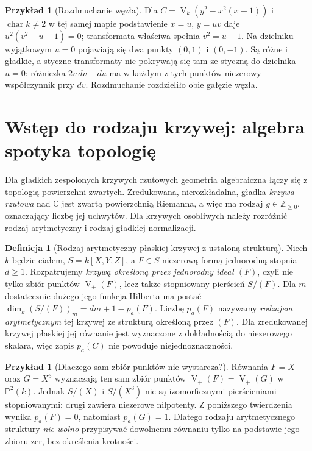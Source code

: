 \documentclass[11pt,a4paper,openany]{report}
\numberwithin{equation}{section}
\theoremstyle{plain}
\theoremstyle{definition}
\newtheorem{definicja}[twierdzenie]{Definicja}
\newtheorem{przyklad}[twierdzenie]{Przykład}
\theoremstyle{remark}
\newcommand{\Z}{\mathbb Z}
\newcommand{\C}{\mathbb C}
\newcommand{\PP}{\mathbb P}
\newcommand{\V}{\operatorname V}
\begin{document}
\begin{przyklad}[Rozdmuchanie węzła]
Dla $C=\V_k(y^2-x^2(x+1))$ i $\operatorname{char}k\ne2$
w tej samej mapie podstawienie $x=u$, $y=uv$ daje
$u^2(v^2-u-1)=0$; transformata właściwa spełnia
$v^2=u+1$. Na dzielniku wyjątkowym $u=0$ pojawiają się
dwa punkty $(0,1)$ i $(0,-1)$. Są różne i gładkie,
a styczne transformaty nie pokrywają się tam ze styczną
do dzielnika $u=0$: różniczka
$2v\,dv-du$ ma w każdym z tych punktów niezerowy
współczynnik przy $dv$. Rozdmuchanie rozdzieliło
obie gałęzie węzła.
\end{przyklad}

\section{Wstęp do rodzaju krzywej: algebra spotyka topologię}

Dla gładkich zespolonych krzywych rzutowych geometria
algebraiczna łączy się z topologią powierzchni zwartych.
Zredukowana, nierozkładalna, gładka \emph{krzywa rzutowa}
nad $\C$ jest zwartą powierzchnią Riemanna, a więc ma rodzaj
$g\in\Z_{\ge0}$, oznaczający liczbę jej uchwytów.
Dla krzywych osobliwych należy rozróżnić rodzaj
arytmetyczny i rodzaj gładkiej normalizacji.

\begin{definicja}[Rodzaj arytmetyczny płaskiej krzywej z ustaloną strukturą]
Niech $k$ będzie ciałem, $S=k[X,Y,Z]$, a $F\in S$
niezerową formą jednorodną stopnia $d\ge1$.
Rozpatrujemy \emph{krzywą określoną przez jednorodny
ideał $(F)$}, czyli nie tylko zbiór punktów
$\V_+(F)$, lecz także stopniowany pierścień $S/(F)$.
Dla $m$ dostatecznie dużego jego funkcja Hilberta ma
postać $\dim_k(S/(F))_m=dm+1-p_a(F)$.
Liczbę $p_a(F)$ nazywamy \emph{rodzajem arytmetycznym}
tej krzywej ze strukturą określoną przez $(F)$.
Dla zredukowanej krzywej płaskiej jej równanie jest
wyznaczone z dokładnością do niezerowego skalara,
więc zapis $p_a(C)$ nie powoduje niejednoznaczności.
\end{definicja}

\begin{przyklad}[Dlaczego sam zbiór punktów nie wystarcza?]
Równania $F=X$ oraz $G=X^3$ wyznaczają ten sam
zbiór punktów $\V_+(F)=\V_+(G)$ w $\PP^2(k)$.
Jednak $S/(X)$ i $S/(X^3)$ nie są izomorficznymi
pierścieniami stopniowanymi: drugi zawiera niezerowe
nilpotenty. Z poniższego twierdzenia wynika
$p_a(F)=0$, natomiast $p_a(G)=1$.
Dlatego rodzaju arytmetycznego struktury \emph{nie wolno}
przypisywać dowolnemu równaniu tylko na podstawie
jego zbioru zer, bez określenia krotności.
\end{przyklad}
\end{document}
